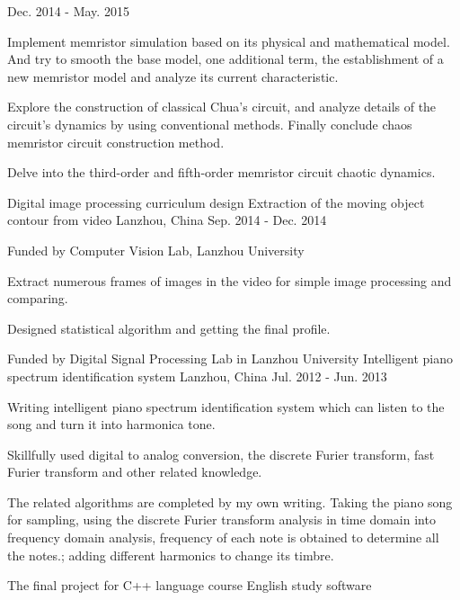 \begin{cventries}
    {Dec. 2014 - May. 2015}
    {
      \begin{cvitems}
        \item {Implement memristor simulation based on its physical and mathematical model. And try to smooth the base model, one additional term, the establishment of a new memristor model and analyze its current characteristic.}
        \item {Explore the construction of classical Chua's circuit, and analyze details of the circuit's dynamics by using conventional methods. Finally conclude chaos memristor circuit construction method. }
        \item {Delve into the third-order and fifth-order memristor circuit chaotic dynamics.}
      \end{cvitems} 
    }
  \cventry
    {Digital image processing curriculum design}
    {Extraction of  the moving object contour from video}
    {Lanzhou, China}
    {Sep. 2014 - Dec. 2014}
    {
      \begin{cvitems}
        \item {Funded by Computer Vision Lab, Lanzhou University}
        \item {Extract numerous frames of images in the video for simple image processing and comparing.}
        \item {Designed statistical algorithm and getting the final profile.}
      \end{cvitems} 
    }
  \cventry
    {Funded by Digital Signal Processing Lab in Lanzhou University}
    {Intelligent piano spectrum identification system}
    {Lanzhou, China}
    {Jul. 2012 - Jun. 2013}
    {
      \begin{cvitems}
        \item {Writing intelligent piano spectrum identification system which can listen to the song and turn it into harmonica tone.}
        \item {Skillfully used digital to analog conversion, the discrete Furier transform, fast Furier transform and other related knowledge.}
        \item {The related algorithms are completed by my own writing. Taking the piano song for sampling, using the discrete Furier transform analysis in time domain into frequency domain analysis, frequency of each note is obtained to determine all the notes.; adding different harmonics to change its timbre.}
      \end{cvitems}
    }
  \cventry
    {The final project for C++ language course}
    {English study software}

\end{cventries}
